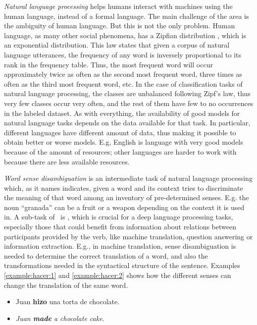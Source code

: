 {\em Natural language processing} helps humans interact with machines using the
human language, instead of a formal language. The main challenge of the area is
the ambiguity of human language. But this is not the only problem. Human
language, as many other social phenomena, has a Zipfian distribution
\cite{j:zpf}, which is an exponential distribution. This law states that given
a corpus of natural language utterances, the frequency of any word is inversely
proportional to its rank in the frequency table. Thus, the most frequent word
will occur approximately twice as often as the second most frequent word, three
times as often as the third most frequent word, etc. In the case of
classification tasks of natural language processing, the classes are unbalanced
following Zipf's law, thus very few classes occur very often, and the rest of
them have few to no occurrences in the labeled dataset. As with everything, the
availability of good models for natural language tasks depends on the data
available for that task. In particular, different languages have different
amount of data, thus making it possible to obtain better or worse models. E.g,
English is language with very good models because of the amount of resources;
other languages are harder to work with because there are less available
resources.

{\em Word sense disambiguation} is an intermediate task of natural language
processing which, as it names indicates, given a word and its context tries to
discriminate the meaning of that word among an inventory of pre-determined
senses. E.g. the noun ``granada'' can be a fruit or a weapon depending on the
context it is used in. A sub-task of \wsd~is {\em \vsd}, which is crucial for a
deep language processing tasks, especially those that could benefit from
information about relations between participants provided by the verb, like
machine translation, question answering or information extraction. E.g., in
machine translation, sense disambiguation is needed to determine the correct
translation of a word, and also the transformations needed in the syntactical
structure of the sentence. Examples \ref{example:hacer:1} and
\ref{example:hacer:2} shows how the different senses can change the translation
of the same word.

\begin{example}\label{example:hacer:1}
  \begin{itemize}
    \item Juan {\bf hizo} una torta de chocolate.
    \item {\em Juan {\bf made} a chocolate cake.}
  \end{itemize}
\end{example}

